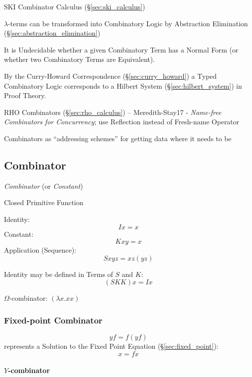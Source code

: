 \fist SKI Combinator Calculus (\S\ref{sec:ski_calculus})

$\lambda$-terms can be transformed into Combinatory Logic by Abstraction
Elimination (\S\ref{sec:abstraction_elimination})

It is Undecidable whether a given Combinatory Term has a Normal Form (or whether
two Combinatory Terms are Equivalent).

By the Curry-Howard Correspondence (\S\ref{sec:curry_howard}) a Typed
Combinatory Logic corresponds to a Hilbert System (\S\ref{sec:hilbert_system})
in Proof Theory.

\fist RHO Combinators (\S\ref{sec:rho_calculus}) --
Meredith-Stay17 - \emph{Name-free Combinators for Concurrency}; use Reflection
instead of Fresh-name Operator

Combinators as ``addressing schemes'' for getting data where it needs to be



\subsection{Combinator}\label{sec:combinator}

\emph{Combinator} (or \emph{Constant})

Closed Primitive Function

Identity:
\[
  I x = x
\]
Constant:
\[
  K x y = x
\]
Application (Sequence):
\[
  S x y z = x z (y z)
\]

Identity may be defined in Terms of $S$ and $K$:
\[
  (S K K) x = I x
\]

$\Omega$-combinator: $(\lambda x. x x)$



\subsubsection{Fixed-point Combinator}\label{sec:fixedpoint_combinator}

\[
  y f = f (y f)
\]
represents a Solution to the Fixed Point Equation (\S\ref{sec:fixed_point}):
\[
  x = f x
\]



\paragraph{$Y$-combinator}\label{sec:y_combinator}\hfill

